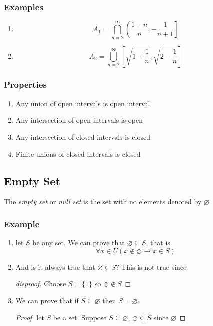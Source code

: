 \documentclass[12pt]{book}
\newcommand{\sqbkt}[1]{\left[ #1 \right]}
\newcommand{\paren}[1]{\left( #1 \right)}
\newcommand{\then}{\rightarrow}
\begin{document}
\subsubsection{Examples}
\begin{enumerate}
    \item \[
    A_1 = \bigcap_{n=2}^{\infty} \left( \frac{1-n}{n}, -\frac{1}{n+1} \right]
    \]
    \item \[
    A_2 = \bigcup_{n=2}^{\infty} \sqbkt{\sqrt{1 + \frac{1}{n}}, \sqrt{2 - \frac{1}{n}}}
    \]
\end{enumerate}


\subsubsection{Properties}
    \begin{enumerate}
        \item Any union of open intervals is open interval
        \item Any intersection of open intervals is open
        \item Any intersection of closed intervals is closed
        \item Finite unions of closed intervals is closed 
    \end{enumerate}

\subsection{Empty Set}
The \textit{empty set} or \textit{null set} is the set with no elements denoted by $\varnothing$
\subsubsection{Example}
\begin{enumerate}
    \item let $S$ be any set. We can prove that $\varnothing \subseteq S$, that is
    \[
    \forall x \in U \paren{x \notin \varnothing \then x \in S}
    \]
    \item And is it always true that $\varnothing \in S$? This is not true since
    \begin{proof}[disproof]
        Choose $S = \{1\}$ so $\varnothing \notin S$
    \end{proof}
    
    \item We can prove that if $S \subseteq \varnothing$ then $S = \varnothing$.
        \begin{proof}
            let $S$ be a set. Suppose $S \subseteq \varnothing$, $\varnothing \subseteq S$ since $\varnothing $
        \end{proof}
    \end{enumerate}
\end{document}
